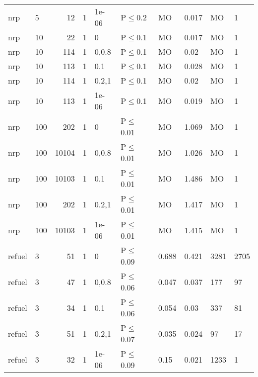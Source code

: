 \begin{longtable}{llrrllllll}
 nrp           & 5        &     	12 & 1 & 1e-06 & P$\leq$0.2   & MO      & 0.017    & MO     & 1      \\
 nrp           & 10       &     	22 & 1 & 0     & P$\leq$0.1   & MO      & 0.017    & MO     & 1      \\
 nrp           & 10       &    	114 & 1 & 0,0.8 & P$\leq$0.1   & MO      & 0.02     & MO     & 1      \\
 nrp           & 10       &    	113 & 1 & 0.1   & P$\leq$0.1   & MO      & 0.028    & MO     & 1      \\
 nrp           & 10       &    	114 & 1 & 0.2,1 & P$\leq$0.1   & MO      & 0.02     & MO     & 1      \\
 nrp           & 10       &    	113 & 1 & 1e-06 & P$\leq$0.1   & MO      & 0.019    & MO     & 1      \\
 nrp           & 100      &    	202 & 1 & 0     & P$\leq$0.01  & MO      & 1.069    & MO     & 1      \\
 nrp           & 100      &  	10104 & 1 & 0,0.8 & P$\leq$0.01  & MO      & 1.026    & MO     & 1      \\
 nrp           & 100      &  	10103 & 1 & 0.1   & P$\leq$0.01  & MO      & 1.486    & MO     & 1      \\
 nrp           & 100      &    	202 & 1 & 0.2,1 & P$\leq$0.01  & MO      & 1.417    & MO     & 1      \\
 nrp           & 100      &  	10103 & 1 & 1e-06 & P$\leq$0.01  & MO      & 1.415    & MO     & 1      \\
 refuel        & 3        &     	51 & 1 & 0     & P$\leq$0.09  & 0.688   & 0.421    & 3281   & 2705   \\
 refuel        & 3        &     	47 & 1 & 0,0.8 & P$\leq$0.06  & 0.047   & 0.037    & 177    & 97     \\
 refuel        & 3        &     	34 & 1 & 0.1   & P$\leq$0.06  & 0.054   & 0.03     & 337    & 81     \\
 refuel        & 3        &     	51 & 1 & 0.2,1 & P$\leq$0.07  & 0.035   & 0.024    & 97     & 17     \\
 refuel        & 3        &     	32 & 1 & 1e-06 & P$\leq$0.09  & 0.15    & 0.021    & 1233   & 1      \\
\bottomrule
\end{longtable}
